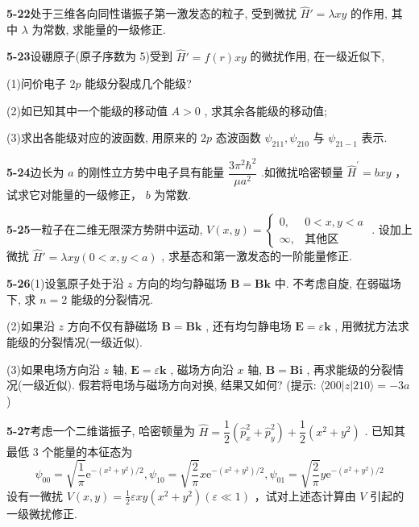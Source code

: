 \vfill

\newpage
\vfill

\noindent
\textbf{5-22}\quad 处于三维各向同性谐振子第一激发态的粒子, 受到微扰 $\hat{H}' = \lambda xy$ 的作用, 其中 $\lambda$ 为常数, 求能量的一级修正.

\vfill

\newpage
\vfill

\noindent
\textbf{5-23}\quad 设硼原子(原子序数为 5)受到 $\hat{H}' = f(r)xy$ 的微扰作用, 在一级近似下, 

(1)问价电子 $2p$ 能级分裂成几个能级? 

(2)如已知其中一个能级的移动值 $A > 0$ , 求其余各能级的移动值; 

(3)求出各能级对应的波函数, 用原来的 $2p$ 态波函数 $\psi_{211}, \psi_{210}$ 与 $\psi_{21-1}$ 表示.

\vfill

\newpage
\vfill

\noindent
\textbf{5-24}\quad 边长为 $a$ 的刚性立方势中电子具有能量 $\dfrac{3\pi^2\hbar^2}{\mu a^2}$ .如微扰哈密顿量 $\hat{H}^{\prime} = bxy$ ，试求它对能量的一级修正， $b$ 为常数.

\vfill

\newpage
\vfill

\noindent
\textbf{5-25}\quad 一粒子在二维无限深方势阱中运动, $V(x,y) = \begin{cases} 0, & 0 < x, y < a \\ \infty, & \text{其他区} \end{cases}$ . 设加上微扰 $\hat{H}' = \lambda xy (0 < x, y < a)$ , 求基态和第一激发态的一阶能量修正.

\vfill

\newpage
\vfill

\noindent
\textbf{5-26}\quad (1)设氢原子处于沿 $z$ 方向的均匀静磁场 $\pmb{B} = \pmb{B}\pmb{k}$ 中. 不考虑自旋, 在弱磁场下, 求 $n = 2$ 能级的分裂情况. 

(2)如果沿 $z$ 方向不仅有静磁场 $\pmb{B} = \pmb{B}\pmb{k}$ , 还有均匀静电场 $\pmb{E} = \varepsilon \pmb{k}$ , 用微扰方法求能级的分裂情况(一级近似). 

(3)如果电场方向沿 $z$ 轴, $\pmb{E} = \varepsilon \pmb{k}$ , 磁场方向沿 $x$ 轴, $\pmb{B} = \pmb{B}\pmb{i}$ , 再求能级的分裂情况(一级近似). 假若将电场与磁场方向对换, 结果又如何? (提示: $\langle 200|z|210\rangle = -3a$ )

\vfill

\newpage
\vfill

\noindent
\textbf{5-27}\quad 考虑一个二维谐振子, 哈密顿量为 $\hat{H} = \dfrac{1}{2} (\hat{p}_x^2 + \hat{p}_y^2) + \dfrac{1}{2} (x^2 + y^2)$ . 已知其最低 3 个能量的本征态为
$$
\psi_ {0 0} = \sqrt {\frac {1}{\pi}} \mathrm{e} ^ {- (x ^ {2} + y ^ {2}) / 2}, \psi_ {1 0} = \sqrt {\frac {2}{\pi}} x \mathrm{e} ^ {- (x ^ {2} + y ^ {2}) / 2}, \psi_ {0 1} = \sqrt {\frac {2}{\pi}} y \mathrm{e} ^ {- (x ^ {2} + y ^ {2}) / 2}
$$
设有一微扰 $V(x,y) = \frac{1}{2}\varepsilon xy(x^2 +y^2)(\varepsilon \ll 1)$ ，试对上述态计算由 $V$ 引起的一级微扰修正.

